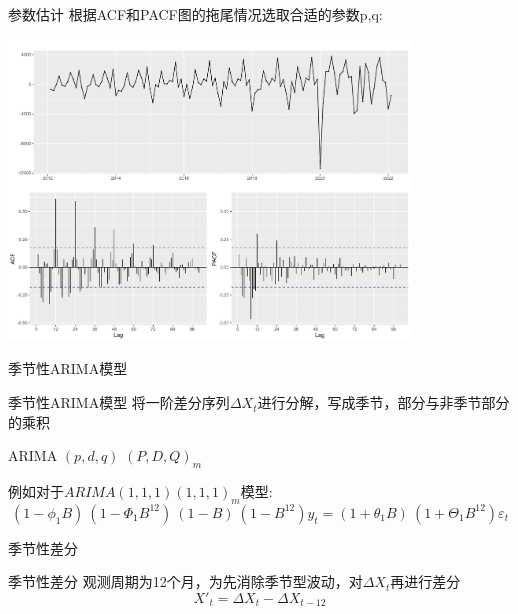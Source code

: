 \documentclass[10pt]{beamer}
\begin{document}
\begin{frame}{参数估计}
  根据ACF和PACF图的拖尾情况选取合适的参数p,q:
  \begin{center}
    \includegraphics[width=0.8\textwidth]{figures/acf_pacf.pdf}
  \end{center}   
\end{frame}
\begin{frame}{季节性ARIMA模型}
  \begin{block}{季节性ARIMA模型}
    将一阶差分序列\(\Delta X_t\)进行分解，写成季节，部分与非季节部分的乘积

    \begin{center}
      ARIMA\;\;\;\;	\((p, d, q)\)	\;\;\;\;\; \((P, D, Q)_{m}\) \label{Season_decompose}
    \end{center}
    
    例如对于\(ARIMA(1,1,1)(1,1,1)_m\)模型:
    \[(1 - \phi_{1}B)~(1 - \Phi_{1}B^{12})~(1 - B)~(1 - B^{12})y_{t} = (1 + \theta_{1}B)~ (1 + \Theta_{1}B^{12})\varepsilon_{t}\]
  \end{block}
\end{frame}

\begin{frame}{季节性差分}
  \begin{block}{季节性差分}
    观测周期为12个月，为先消除季节型波动，对\(\Delta X_t\)再进行差分
    \[X'_{t} = \Delta X_t-\Delta X_{t-12}\]
  \end{block}
\end{frame}
\end{document}

